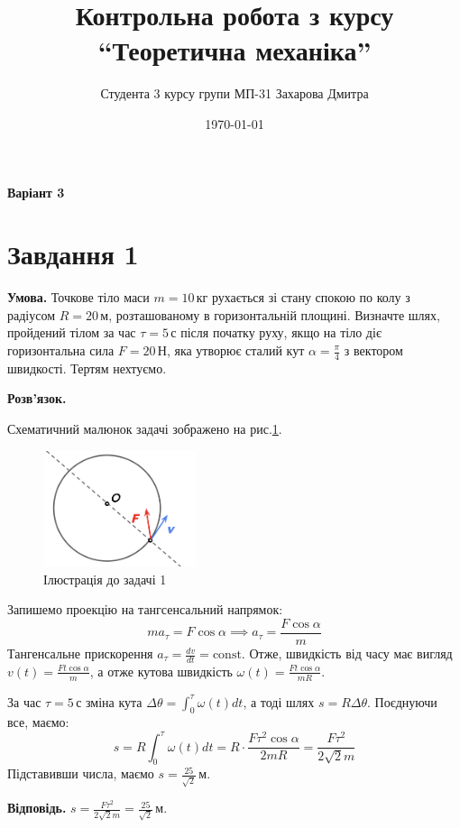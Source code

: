 \documentclass[14pt]{extarticle}
\title{Контрольна робота з курсу ``Теоретична механіка''}
\author{Студента 3 курсу групи МП-31 Захарова Дмитра}
\date{\today}
\begin{document}
\maketitle

\begin{center}
\textbf{Варіант 3}
\end{center}

\section*{Завдання 1} 

\textbf{Умова.} Точкове тіло маси $m=10\,\text{кг}$ рухається зі стану спокою по колу з радіусом $R=20\,\text{м}$, розташованому в горизонтальній площині. Визначте шлях,
пройдений тілом за час $\tau = 5\,\text{с}$ після початку руху, якщо на тіло діє
горизонтальна сила $F = 20\,\text{Н}$, яка утворює сталий кут $\alpha=\frac{\pi}{4}$ з вектором швидкості. Тертям нехтуємо.

\textbf{Розв'язок.} 

Схематичний малюнок задачі зображено на рис.\ref{fig:1}.

\begin{figure}[H]
    \centering
    \includegraphics[width=0.4\textwidth]{images/test_2/problem_1.png}
    \caption{Ілюстрація до задачі 1}
    \label{fig:1}
\end{figure}

Запишемо проекцію на тангсенсальний напрямок:
\[
ma_{\tau} = F \cos\alpha \implies a_{\tau} = \frac{F \cos \alpha}{m}
\]
Тангенсальне прискорення $a_{\tau}=\frac{dv}{dt}=\text{const}$. Отже, швидкість від часу має вигляд $v(t)=\frac{Ft \cos\alpha}{m}$, а отже кутова швидкість $\omega(t) = \frac{Ft \cos\alpha}{mR}$. 

За час $\tau=5\,\text{с}$ зміна кута $\Delta \theta = \int_0^{\tau}\omega(t)dt$, а тоді шлях $s=R\Delta\theta$. Поєднуючи все, маємо:
\[
s = R\int_0^{\tau}\omega(t)dt = R \cdot \frac{F\tau^2 \cos\alpha}{2mR} = \frac{F\tau^2}{2\sqrt{2}m}
\]
Підставивши числа, маємо $s=\frac{25}{\sqrt{2}}\, \text{м}$. 

\textbf{Відповідь.} $s=\frac{F\tau^2}{2\sqrt{2}m}=\frac{25}{\sqrt{2}}\,\text{м}$.
\end{document}
